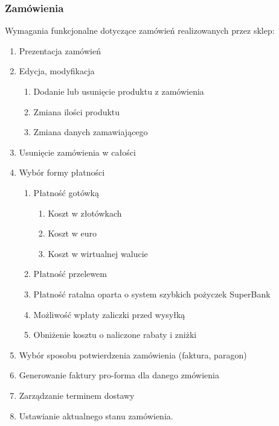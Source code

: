 \subsubsection{Zamówienia}

Wymagania funkcjonalne dotyczące zamówień realizowanych przez sklep:

\begin{enumerate}
  \item Prezentacja zamówień
  \item Edycja, modyfikacja
  \begin{enumerate}
    \item Dodanie lub usunięcie produktu z zamówienia
    \item Zmiana ilości produktu
    \item Zmiana danych zamawiającego
  \end{enumerate}
  \item Usunięcie zamówienia w całości
  \item Wybór formy płatności
  \begin{enumerate}
    \item Płatność gotówką
    \begin{enumerate}
      \item Koszt w złotówkach
      \item Koszt w euro
      \item Koszt w wirtualnej walucie
    \end{enumerate}
    \item Płatność przelewem
    \item Płatność ratalna oparta o system szybkich pożyczek SuperBank
    \item Możliwość wpłaty zaliczki przed wysyłką
    \item Obniżenie kosztu o naliczone rabaty i zniżki
  \end{enumerate}
  \item Wybór sposobu potwierdzenia zamówienia (faktura, paragon)
  \item Generowanie faktury pro-forma dla danego zmówienia
  \item Zarządzanie terminem dostawy
  \item Ustawianie aktualnego stanu zamówienia.
\end{enumerate}